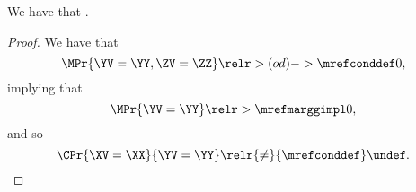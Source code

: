 \begin{proposition}
  We have that \cpproblimdefimplprop.%
\end{proposition}

\begin{proof}
  We have that 
  $$\MPr{\YV = \YY, \ZV = \ZZ} \relr > {(od)->\mrefconddef} 0,$$ 
  implying that
  $$\MPr{\YV = \YY} \relr > {\mrefmarggimpl} 0,$$
  and so
  $$\CPr{\XV = \XX}{\YV = \YY} \relr {\ne} {\mrefconddef} \undef.$$
\end{proof}
